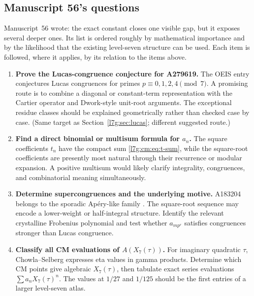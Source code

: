 \documentclass[11pt,letterpaper]{article}
\theoremstyle{remark}\newtheorem{remark}[theorem]{Remark}
\newcounter{l7gtrsavedeq}
\begin{document}
\subsection{Manuscript 56's questions}\label{l7g:cm:sec:further}
Manuscript~56 wrote: the exact constant closes one visible gap, but it
exposes several deeper ones. Its list is ordered roughly by mathematical
importance and by the likelihood that the existing level-seven structure
can be used. Each item is followed, where it applies, by its relation to
the items above.

\begin{enumerate}[leftmargin=2em,label=\textbf{R\arabic*.}]
\item \textbf{Prove the Lucas-congruence conjecture for A279619.}
The OEIS entry conjectures Lucas congruences for primes
$p\equiv0,1,2,4\pmod7$. A promising route is to combine a diagonal or
constant-term representation with the Cartier operator and Dwork-style
unit-root arguments. The exceptional residue classes should be explained
geometrically rather than checked case by case.
(Same target as Section~\ref{l7g:sec:lucas}; different suggested route.)

\item \textbf{Find a direct binomial or multisum formula for $a_n$.}
The square coefficients $t_n$ have the compact sum
\eqref{l7g:cm:eq:t-sum}, while the square-root coefficients are presently
most natural through their recurrence or modular expansion. A positive
multisum would likely clarify integrality, congruences, and combinatorial
meaning simultaneously.

\item \textbf{Determine supercongruences and the underlying motive.}
A183204 belongs to the sporadic Ap\'ery-like family \cite{l7g:cooper}.
The square-root sequence may encode a lower-weight or half-integral
structure. Identify the relevant crystalline Frobenius polynomial and
test whether $a_{mp^r}$ satisfies congruences stronger than Lucas
congruence.

\item \textbf{Classify all CM evaluations of $A(X_7(\tau))$.}
For imaginary quadratic $\tau$, Chowla--Selberg expresses eta values in
gamma products. Determine which CM points give algebraic $X_7(\tau)$,
then tabulate exact series evaluations
$\sum a_nX_7(\tau)^n$. The values at $1/27$ and $1/125$ should be the
first entries of a larger level-seven atlas.


\end{enumerate}
\end{document}
